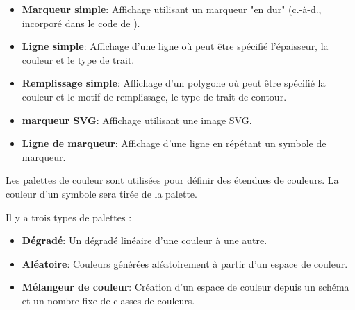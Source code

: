 \begin{itemize}[label=--]
\item \textbf{Marqueur simple}: Affichage utilisant un marqueur "en dur" (c.-à-d., incorporé dans le code de \qg).
\item \textbf{Ligne simple}: Affichage d'une ligne où peut être spécifié l'épaisseur, la couleur et le type de trait.
\item \textbf{Remplissage simple}: Affichage d'un polygone où peut être spécifié la couleur et le motif de remplissage, le type de trait de contour.
\item \textbf{marqueur SVG}: Affichage utilisant une image SVG.
\item \textbf{Ligne de marqueur}: Affichage d'une ligne en répétant un symbole de marqueur.
\end{itemize}


Les palettes de couleur sont utilisées pour définir des étendues de couleurs. La couleur d'un symbole sera tirée de la palette.

Il y a trois types de palettes :

\begin{itemize}[label=--]
\item \textbf{Dégradé}: Un dégradé linéaire d'une couleur à une autre.
\item \textbf{Aléatoire}: Couleurs générées aléatoirement à partir d'un espace de couleur.
\item \textbf{Mélangeur de couleur}: Création d'un espace de couleur depuis un schéma et un nombre fixe de classes de couleurs.
\end{itemize}

